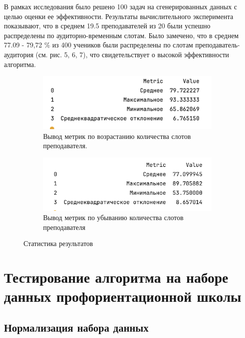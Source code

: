 В рамках исследования было решено 100 задач на сгенерированных данных с целью оценки ее эффективности. Результаты вычислительного эксперимента показывают, что в среднем 19.5 преподавателей из 20 были успешно распределены по аудиторно-временным слотам.  Было замечено, что в среднем 77.09 - 79,72 \% из 400 учеников были распределены по слотам преподаватель-аудитория (см. рис. 5, 6, 7), что свидетельствует о высокой эффективности алгоритма.\begin{figure}[!ht]
  \centering
  \begin{subfigure}[b]{0.45\textwidth}
    \centering
    \includegraphics[width=\textwidth]{Images/stat_1.png}
    \caption{Вывод метрик по возрастанию количества  слотов преподавателя.}
    \label{fig:stat1}
  \end{subfigure}
  \hfill
  \begin{subfigure}[b]{0.45\textwidth}
    \centering
    \includegraphics[width=\textwidth]{Images/stat_2.png}
    \caption{Вывод метрик по убыванию количества  слотов преподавателя}
    \label{fig:stat2}
  \end{subfigure}
  \caption{Статистика результатов}
  \label{fig:both_images}
\end{figure}


\section{Тестирование алгоритма на наборе данных профориентационной школы}
\label{MACR-SecMethods}

\subsection{Нормализация набора данных}
\label{MACR-SubSecMD}

